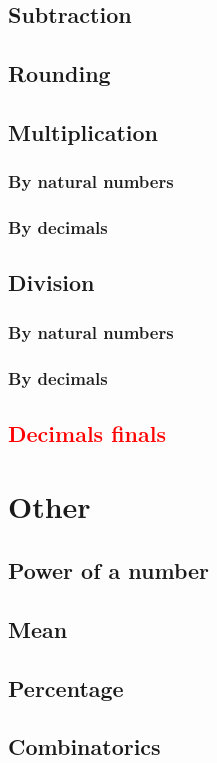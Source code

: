 \documentclass[a4paper]{article}
\begin{document}
\begin{multicols}{2}
		\subsection{Subtraction}
		\subsection{Rounding}
		\subsection{Multiplication}
		\subsubsection{By natural numbers}
		\subsubsection{By decimals}
		\subsection{Division}
		\subsubsection{By natural numbers}
		\subsubsection{By decimals} 
		\subsection{\textcolor{red}{Decimals finals}}
		
		{\Large \section {Other}}
		
		\subsection{Power of a number}
		\subsection{Mean}
		\subsection{Percentage}
		\subsection{Combinatorics} \hspace{1.5cm}


\end{multicols}
\end{document}

